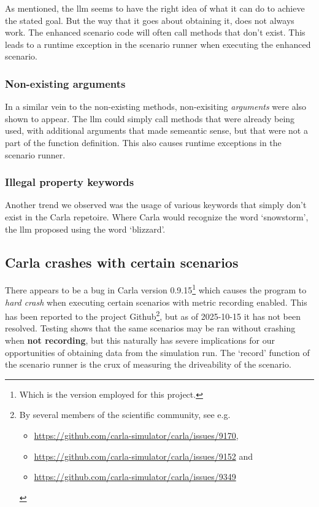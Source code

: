 As mentioned, the \acrshort{llm} seems to have the right idea of what it can do
to achieve the stated goal. But the way that it goes about obtaining it, does
not always work. The enhanced scenario code will often call methods that don't
exist. This leads to a runtime exception in the scenario runner when executing
the enhanced scenario.

\subsubsection{Non-existing arguments}

In a similar vein to the non-existing methods, non-exisiting \emph{arguments}
were also shown to appear. The \acrshort{llm} could simply call methods that
were already being used, with additional arguments that made semeantic sense,
but that were not a part of the function definition. This also causes runtime
exceptions in the scenario runner.

\subsubsection{Illegal property keywords}

Another trend we observed was the usage of various keywords that simply don't
exist in the Carla repetoire. Where Carla would recognize the word `snowstorm',
the \acrfull{llm} proposed using the word `blizzard'.



\subsection{Carla crashes with certain scenarios}

There appears to be a bug in Carla version 0.9.15\footnote{Which is the version
    employed for this project.} which causes the program to \emph{hard crash} when
executing certain scenarios with metric recording enabled. This has been
reported to the project Github\footnote{By several members of the scientific community, see e.g.
    \begin{itemize}\item  \url{https://github.com/carla-simulator/carla/issues/9170}, \item
              \url{https://github.com/carla-simulator/carla/issues/9152} and \item
              \url{https://github.com/carla-simulator/carla/issues/9349}\end{itemize}}, but as of 2025-10-15
it has not been resolved. Testing shows that the same scenarios may be ran without crashing when
\textbf{not recording}, but this naturally has severe implications for our
opportunities of obtaining data from the simulation run. The `record' function
of the scenario runner is the crux of measuring the driveability of the
scenario.


